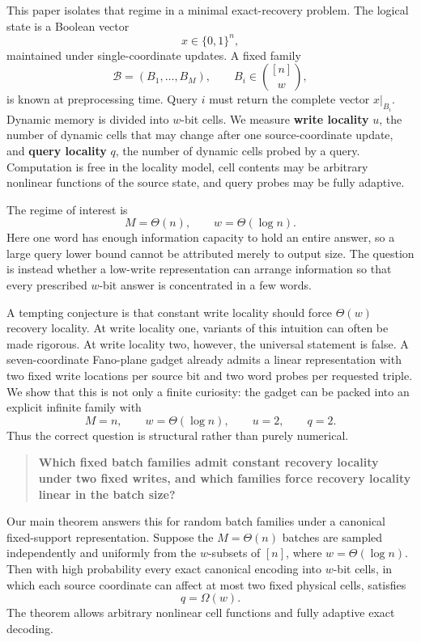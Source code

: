 \documentclass[
]{article}
\begin{document}
This paper isolates that regime in a minimal exact-recovery problem. The
logical state is a Boolean vector \[
 x\in\{0,1\}^n,
\] maintained under single-coordinate updates. A fixed family \[
 \mathcal B=(B_1,\ldots,B_M),\qquad B_i\in\binom{[n]}{w},
\] is known at preprocessing time. Query \(i\) must return the complete
vector \(x|_{B_i}\). Dynamic memory is divided into \(w\)-bit cells. We
measure \textbf{write locality} \(u\), the number of dynamic cells that
may change after one source-coordinate update, and \textbf{query
locality} \(q\), the number of dynamic cells probed by a query.
Computation is free in the locality model, cell contents may be
arbitrary nonlinear functions of the source state, and query probes may
be fully adaptive.

The regime of interest is \[
 M=\Theta(n),\qquad w=\Theta(\log n).
\] Here one word has enough information capacity to hold an entire
answer, so a large query lower bound cannot be attributed merely to
output size. The question is instead whether a low-write representation
can arrange information so that every prescribed \(w\)-bit answer is
concentrated in a few words.

A tempting conjecture is that constant write locality should force
\(\Theta(w)\) recovery locality. At write locality one, variants of this
intuition can often be made rigorous. At write locality two, however,
the universal statement is false. A seven-coordinate Fano-plane gadget
already admits a linear representation with two fixed write locations
per source bit and two word probes per requested triple. We show that
this is not only a finite curiosity: the gadget can be packed into an
explicit infinite family with \[
 M=n,\qquad w=\Theta(\log n),\qquad u=2,\qquad q=2.
\] Thus the correct question is structural rather than purely numerical.

\begin{quote}
\textbf{Which fixed batch families admit constant recovery locality
under two fixed writes, and which families force recovery locality
linear in the batch size?}
\end{quote}

Our main theorem answers this for random batch families under a
canonical fixed-support representation. Suppose the \(M=\Theta(n)\)
batches are sampled independently and uniformly from the \(w\)-subsets
of \([n]\), where \(w=\Theta(\log n)\). Then with high probability every
exact canonical encoding into \(w\)-bit cells, in which each source
coordinate can affect at most two fixed physical cells, satisfies \[
 \boxed{q=\Omega(w)}.
\] The theorem allows arbitrary nonlinear cell functions and fully
adaptive exact decoding.
\end{document}
